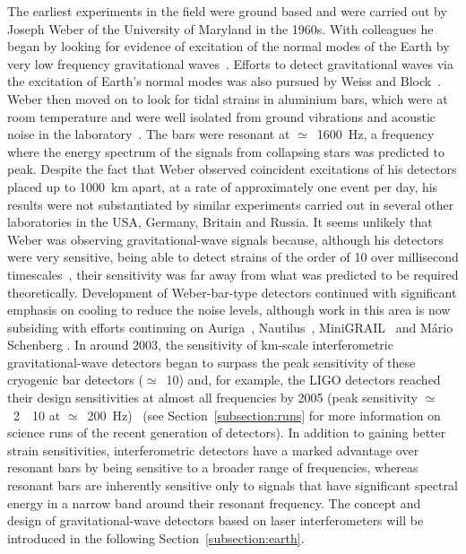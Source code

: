 The earliest experiments in the field were ground based and were carried out by
Joseph Weber of the University of Maryland in the 1960s. With colleagues he
began by looking for evidence of excitation of the normal modes of the Earth by
very low frequency gravitational waves~\cite{Forward2}. Efforts to detect gravitational
waves via the excitation of Earth's normal modes was also pursued by Weiss and Block~\cite{Weiss:1965}.
Weber then moved on to look for tidal strains in aluminium bars, which were at room temperature and were
well isolated from ground vibrations and acoustic noise in the
laboratory~\cite{Weber1, Weber2}. The bars were resonant at $\simeq$~1600~Hz, a
frequency where the energy spectrum of the signals from collapsing stars was
predicted to peak. Despite the fact that Weber observed coincident excitations
of his detectors placed up to 1000~km apart, at a rate of approximately one
event per day, his results were not substantiated by similar experiments carried
out in several other laboratories in the USA, Germany, Britain and Russia. It
seems unlikely that Weber was observing gravitational-wave signals because,
although his detectors were very sensitive, being able to detect strains of the
order of 10 over millisecond timescales~\cite{Weber1}, their sensitivity
was far away from what was predicted to be required theoretically. Development
of Weber-bar-type detectors continued with significant emphasis on cooling to
reduce the noise levels, although work in this area is now subsiding with
efforts continuing on Auriga~\cite{AURIGA}, Nautilus~\cite{NAUTILUS},
MiniGRAIL~\cite{MiniGRAIL, Gottardi:2007} and M\'{a}rio Schenberg
\cite{Schenberg, Aguiar:2006}.  In around 2003, the sensitivity of km-scale
interferometric gravitational-wave detectors began to surpass the peak
sensitivity of these cryogenic bar detectors ($\simeq$~10)
and, for example, the LIGO detectors reached their design sensitivities at
almost all frequencies by 2005 (peak sensitivity
$\simeq$~2~\texttimes~10 at
$\simeq$~200~Hz)~\cite{Whitcomb:2008} (see
Section~\ref{subsection:runs} for more information on science runs of
the recent generation of detectors).  In addition to gaining better
strain sensitivities, interferometric detectors have a marked
advantage over resonant bars by being sensitive to a broader range of
frequencies, whereas resonant bars are inherently sensitive only to
signals that have significant spectral energy in a narrow band around
their resonant frequency. The concept and design of gravitational-wave
detectors based on laser interferometers will be introduced in the
following Section~\ref{subsection:earth}. 


